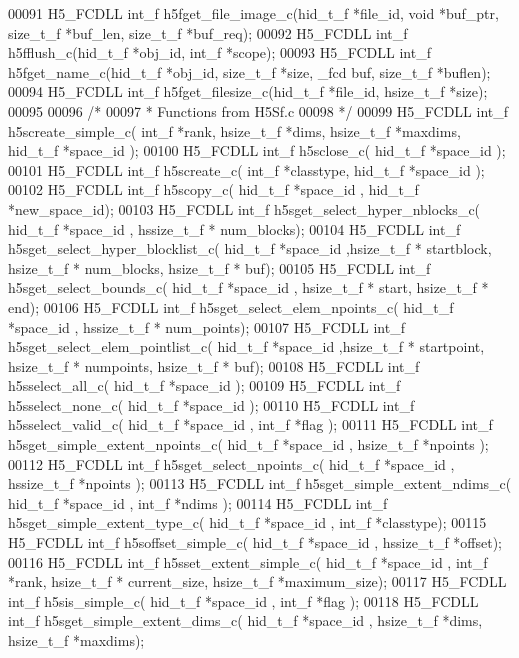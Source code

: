 \begin{DoxyCode}
00091 H5\_FCDLL int\_f h5fget\_file\_image\_c(hid\_t\_f *file\_id, \textcolor{keywordtype}{void} *buf\_ptr, size\_t\_f *buf\_len, size\_t\_f *buf\_req);
00092 H5\_FCDLL int\_f h5fflush\_c(hid\_t\_f *obj\_id, int\_f *scope);
00093 H5\_FCDLL int\_f h5fget\_name\_c(hid\_t\_f *obj\_id, size\_t\_f *size, \_fcd buf, size\_t\_f *buflen);
00094 H5\_FCDLL int\_f h5fget\_filesize\_c(hid\_t\_f *file\_id, hsize\_t\_f *size);
00095 
00096 \textcolor{comment}{/*}
00097 \textcolor{comment}{ * Functions from H5Sf.c}
00098 \textcolor{comment}{ */}
00099 H5\_FCDLL int\_f h5screate\_simple\_c( int\_f *rank, hsize\_t\_f *dims, hsize\_t\_f *maxdims, hid\_t\_f *space\_id );
00100 H5\_FCDLL int\_f h5sclose\_c( hid\_t\_f *space\_id );
00101 H5\_FCDLL int\_f h5screate\_c( int\_f *classtype, hid\_t\_f *space\_id );
00102 H5\_FCDLL int\_f h5scopy\_c( hid\_t\_f *space\_id , hid\_t\_f *new\_space\_id);
00103 H5\_FCDLL int\_f h5sget\_select\_hyper\_nblocks\_c( hid\_t\_f *space\_id , hssize\_t\_f * num\_blocks);
00104 H5\_FCDLL int\_f h5sget\_select\_hyper\_blocklist\_c( hid\_t\_f *space\_id ,hsize\_t\_f * startblock, hsize\_t\_f * 
      num\_blocks, hsize\_t\_f * buf);
00105 H5\_FCDLL int\_f h5sget\_select\_bounds\_c( hid\_t\_f *space\_id , hsize\_t\_f * start, hsize\_t\_f * end);
00106 H5\_FCDLL int\_f h5sget\_select\_elem\_npoints\_c( hid\_t\_f *space\_id , hssize\_t\_f * num\_points);
00107 H5\_FCDLL int\_f h5sget\_select\_elem\_pointlist\_c( hid\_t\_f *space\_id ,hsize\_t\_f * startpoint, hsize\_t\_f * 
      numpoints, hsize\_t\_f * buf);
00108 H5\_FCDLL int\_f h5sselect\_all\_c( hid\_t\_f *space\_id );
00109 H5\_FCDLL int\_f h5sselect\_none\_c( hid\_t\_f *space\_id );
00110 H5\_FCDLL int\_f h5sselect\_valid\_c( hid\_t\_f *space\_id , int\_f *flag );
00111 H5\_FCDLL int\_f h5sget\_simple\_extent\_npoints\_c( hid\_t\_f *space\_id , hsize\_t\_f *npoints );
00112 H5\_FCDLL int\_f h5sget\_select\_npoints\_c( hid\_t\_f *space\_id , hssize\_t\_f *npoints );
00113 H5\_FCDLL int\_f h5sget\_simple\_extent\_ndims\_c( hid\_t\_f *space\_id , int\_f *ndims );
00114 H5\_FCDLL int\_f h5sget\_simple\_extent\_type\_c( hid\_t\_f *space\_id , int\_f *classtype);
00115 H5\_FCDLL int\_f h5soffset\_simple\_c( hid\_t\_f *space\_id , hssize\_t\_f *offset);
00116 H5\_FCDLL int\_f h5sset\_extent\_simple\_c( hid\_t\_f *space\_id , int\_f *rank, hsize\_t\_f * current\_size, hsize\_t\_f
       *maximum\_size);
00117 H5\_FCDLL int\_f h5sis\_simple\_c( hid\_t\_f *space\_id , int\_f *flag );
00118 H5\_FCDLL int\_f h5sget\_simple\_extent\_dims\_c( hid\_t\_f *space\_id , hsize\_t\_f *dims, hsize\_t\_f *maxdims);

\end{DoxyCode}
